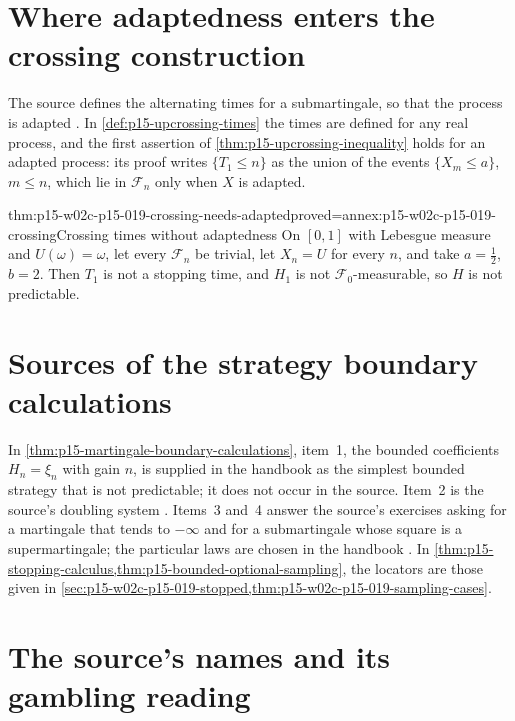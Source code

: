 \section{Where adaptedness enters the crossing construction}
\label{sec:p15-w02c-p15-019-crossings}

The source defines the alternating times for a submartingale, so that
the process is adapted \cite[p.~220]{DurrettPTEAuthor2019}. In
\cref{def:p15-upcrossing-times} the times are defined for any real
process, and the first assertion of
\cref{thm:p15-upcrossing-inequality} holds for an adapted process: its
proof writes \(\{T_1\leq n\}\) as the union of the events
\(\{X_m\leq a\}\), \(m\leq n\), which lie in \(\mathcal F_n\) only when
\(X\) is adapted.

\begin{hbtheorem}{thm:p15-w02c-p15-019-crossing-needs-adapted}{proved=annex:p15-w02c-p15-019-crossing}{Crossing times without adaptedness}
On \([0,1]\) with Lebesgue measure and \(U(\omega)=\omega\), let every
\(\mathcal F_n\) be trivial, let \(X_n=U\) for every \(n\), and take
\(a=\tfrac12\), \(b=2\). Then \(T_1\) is not a stopping time, and
\(H_1\) is not \(\mathcal F_0\)-measurable, so \(H\) is not predictable.
\end{hbtheorem}

\section{Sources of the strategy boundary calculations}
\label{sec:p15-w02c-p15-019-sources}

In \cref{thm:p15-martingale-boundary-calculations}, item~1, the bounded
coefficients \(H_n=\xi_n\) with gain \(n\), is supplied in the handbook
as the simplest bounded strategy that is not predictable; it does not
occur in the source. Item~2 is the source's doubling system
\cite[pp.~219--220]{DurrettPTEAuthor2019}. Items~3 and~4 answer the
source's exercises asking for a martingale that tends to \(-\infty\) and
for a submartingale whose square is a supermartingale; the particular
laws are chosen in the handbook
\cite[exs.~4.2.5 and 4.2.2, p.~223]{DurrettPTEAuthor2019}.
In \cref{thm:p15-stopping-calculus,thm:p15-bounded-optional-sampling},
the locators are those given in
\cref{sec:p15-w02c-p15-019-stopped,thm:p15-w02c-p15-019-sampling-cases}.

\section{The source's names and its gambling reading}
\label{sec:p15-w02c-p15-019-readings}

